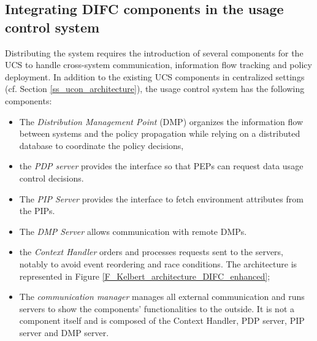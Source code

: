 \subsection{Integrating DIFC components in the usage control system}
\label{ss_architectural_integration_of_difc}
Distributing the system requires the introduction of several components for the UCS to handle cross-system communication, information flow tracking and policy deployment. In addition to the existing UCS components in centralized settings (cf. Section \ref{ss_ucon_architecture}), the usage control system has the following components:
\begin{itemize}
    \item The \emph{Distribution Management Point} (DMP) organizes the information flow between systems and the policy propagation while relying on a distributed database to coordinate the policy decisions,
  \item the \emph{PDP server} provides the interface so that PEPs can request data usage control decisions.
 \item The \emph{PIP Server} provides the interface to fetch environment attributes from the PIPs.
  \item The \emph{DMP Server} allows communication with remote DMPs. 
 \item the \emph{Context Handler} orders and processes requests sent to the servers, 
notably to avoid event reordering and race conditions. The architecture is represented in Figure \ref{F_Kelbert_architecture_DIFC_enhanced};
\item The \emph{communication manager} manages all external communication 
and runs servers to show the components' functionalities to the outside. It is not a component itself and is composed of the Context Handler, PDP server, PIP server and DMP server. 
\end{itemize}



